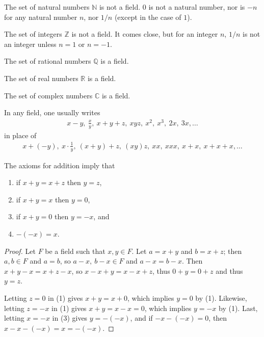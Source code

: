 \documentclass[12pt]{article}
\begin{document}
\begin{exm}
  The set of natural numbers $\mathbb{N}$ is not a field. $0$ is
  not a natural number, nor is $-n$ for any natural number $n$,
  nor $1/n$ (except in the case of $1$).
\end{exm}

\begin{exm}
  The set of integers $\mathbb{Z}$ is not a field. It comes
  close, but for an integer $n$, $1/n$ is not an integer unless
  $n = 1$ or $n = -1$.
\end{exm}

\begin{exm}
  The set of rational numbers $\mathbb{Q}$ is a field.
\end{exm}

\begin{exm}
  The set of real numbers $\mathbb{R}$ is a field.
\end{exm}

\begin{exm}
  The set of complex numbers $\mathbb{C}$ is a field.
\end{exm}

\begin{comm}
  In any field, one usually writes
  \begin{align*}
    x - y,\ \frac{x}{y},\ x + y + z,\ xyz,\ x^2,\ x^3,\ 2x,\ 3x,\ldots
  \end{align*}
  in place of
  \begin{align*}
    x + (-y),\ x \cdot \frac{1}{y},\ (x + y) + z,\ (xy)z,\ xx,\ xxx,\ x + x,\ x + x + x,\ldots
  \end{align*}
\end{comm}

\begin{thm}
  The axioms for addition imply that
  \begin{enumerate}
    \item
      if $x + y = x + z$ then $y = z$,
    \item
      if $x + y = x$ then $y = 0$,
    \item
      if $x + y = 0 $ then $y = -x$, and
    \item
      $-(-x) = x$.
  \end{enumerate}

  \begin{proof}
    Let $F$ be a field such that $x,y \in F$. Let $a = x + y$ and $b = x + z$; then
    $a,b \in F$ and $a = b$, so $a-x,\ b-x \in F$ and $a - x = b - x$. Then $x + y -
    x = x + z - x$, so $x - x + y = x - x + z$, thus $0 + y = 0 + z$ and thus $y = z$.

    Letting $z = 0$ in (1) gives $x + y = x + 0$, which implies $y = 0$ by (1).
    Likewise, letting $z = -x$ in (1) gives $x + y = x - x = 0$, which implies $y =
    -x$ by (1). Last, letting $x = -x$ in (3) gives $y = -(-x)$, and if $-x - (-x) =
    0$, then $x - x - (-x) = x = -(-x)$.
  \end{proof}
\end{thm}
\end{document}
